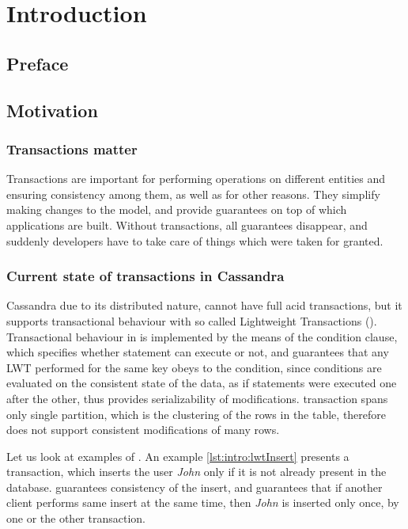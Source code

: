 
\chapter{Introduction}\label{chapter:introduction}

\section{Preface}\label{sec:introduction:preface}

\section{Motivation}\label{sec:introduction:motivation}

\subsection{Transactions matter}

Transactions are important for performing operations on different entities and ensuring consistency among them, as well as for other reasons. They simplify making changes to the model, and provide guarantees on top of which applications are built. Without transactions, all guarantees disappear, and suddenly developers have to take care of things which were taken for granted.

\subsection{Current state of transactions in Cassandra}	
Cassandra due to its distributed nature, cannot have full acid transactions, but it supports transactional behaviour with so called Lightweight Transactions (\lwt).
Transactional behaviour in \lwt is implemented by the means of the condition clause, which specifies whether statement can execute or not, and guarantees that any LWT performed for the same key obeys to the condition, since conditions are evaluated on the consistent state of the data, as if statements were executed one after the other, thus provides serializability of modifications. \lwt transaction spans only single partition, which is the clustering of the rows in the table, therefore \lwt does not support consistent modifications of many rows.

Let us look at examples of \lwt. An example \ref{lst:intro:lwtInsert} presents a transaction, which inserts the user \emph{John} only if it is not already present in the database. \lwt guarantees consistency of the insert, and guarantees that if another client performs same insert at the same time, then \emph{John} is inserted only once, by one or the other transaction.

